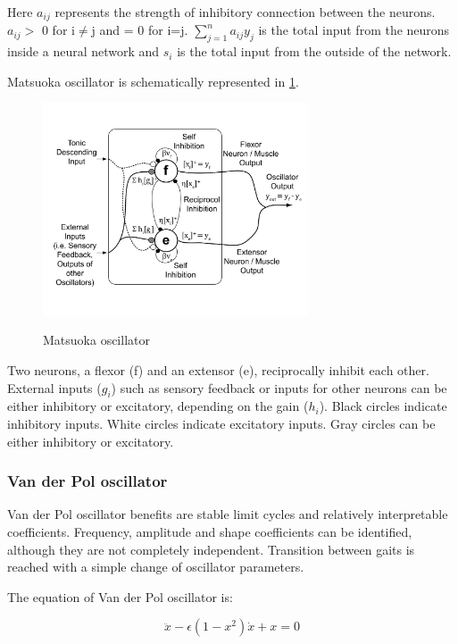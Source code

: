 \documentclass[12pt,a4paper]{report}
\begin{document}
				Here $a_{ij}$ represents the strength of inhibitory connection between the neurons. $a_{ij} >$ 0 for i$\neq$j and = 0 for i=j. $\sum^n_{j = 1} a_{ij} y_j $ is the total input from the neurons inside a neural network and $s_{i}$ is the total input from the outside of the network. 
				
				Matsuoka oscillator is schematically represented in \cref{fig:4}.
				\begin{figure}[h!]
					\vspace{-0.2cm}
					\centering
					{\includegraphics[width=0.7\textwidth]{4}}
					\caption{Matsuoka oscillator \cite{liu2008central}}
					\label{fig:4}
					\vspace{-0.1cm}
				\end{figure}
				
				Two neurons, a flexor (f) and an extensor (e), reciprocally inhibit each other. External inputs ($g_i$) such as sensory feedback or inputs for other neurons can be either inhibitory or excitatory, depending on the gain ($h_i$). Black circles indicate inhibitory inputs. White circles indicate excitatory inputs. Gray circles can be either inhibitory or excitatory.
			\subsubsection{Van der Pol oscillator}
				Van der Pol oscillator benefits are stable limit cycles and relatively interpretable coefficients. Frequency, amplitude and shape coefficients can be identified, although they are not completely independent. Transition between gaits is reached with a simple change of oscillator parameters.
				
				The equation of Van der Pol oscillator is:
				
				\begin{equation}\label{eq:Pol1}
					\ddot{x} - \epsilon(1 - x^2)\dot{x} + x = 0
				\end{equation}
				
\end{document}
